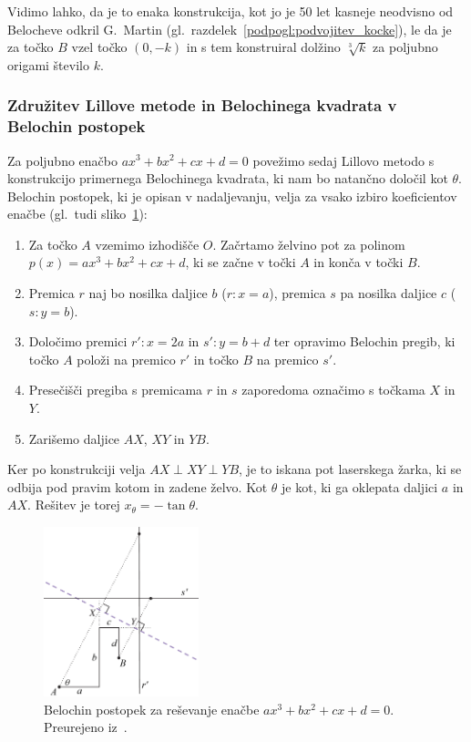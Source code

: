 Vidimo lahko, da je to enaka konstrukcija, kot jo je 50 let kasneje neodvisno od Belocheve odkril G.\ Martin (gl.\ razdelek~\ref{podpogl:podvojitev_kocke}), le da je za točko $B$ vzel točko $(0, -k)$ in s tem konstruiral dolžino $\sqrt[3]{k}$ za poljubno origami število $k$.

\subsubsection*{Združitev Lillove metode in Belochinega kvadrata v Belochin postopek}

Za poljubno enačbo $a x^3 + b x^2 + c x + d = 0$ povežimo sedaj Lillovo metodo s konstrukcijo primernega Belochinega kvadrata, ki nam bo natančno določil kot $\theta$. Belochin postopek, ki je opisan v nadaljevanju, velja za vsako izbiro koeficientov enačbe (gl.\ tudi sliko~\ref{fig:beloch_kubicna_resitev}):

\begin{enumerate}
    \item Za točko $A$ vzemimo izhodišče $O$. Začrtamo želvino pot za polinom $p(x) = a x^3 + b x^2 + c x + d$, ki se začne v točki $A$ in konča v točki $B$.
    \item Premica $r$ naj bo nosilka daljice $b$ ($r: x = a$), premica $s$ pa nosilka daljice $c$ ($s: y = b$).
    \item Določimo premici $r': x = 2a$ in $s': y = b + d$ ter opravimo Belochin pregib, ki točko $A$ položi na premico $r'$ in točko $B$ na premico $s'$.
    \item Presečišči pregiba s premicama $r$ in $s$ zaporedoma označimo s točkama $X$ in $Y$.
    \item Zarišemo daljice $AX$, $XY$ in $YB$.
\end{enumerate}

Ker po konstrukciji velja $ AX \perp XY \perp YB $, je to iskana pot laserskega žarka, ki se odbija pod pravim kotom in zadene želvo. Kot $\theta$ je kot, ki ga oklepata daljici $a$ in $AX$. Rešitev je torej $x_{\theta} = - \tan \theta$.

\begin{figure}[h]
    \centering
    \includegraphics[width=0.4\textwidth]{images/kubična enačba/beloch_kubicna_resitev.png}
    \caption[Lillova metoda z Belochinim kvadratom]{Belochin postopek za reševanje enačbe $a x^3 + b x^2 + c x + d = 0$. Preurejeno iz~\cite[str.\ 42]{hull2020}.}
    \label{fig:beloch_kubicna_resitev}
\end{figure}

